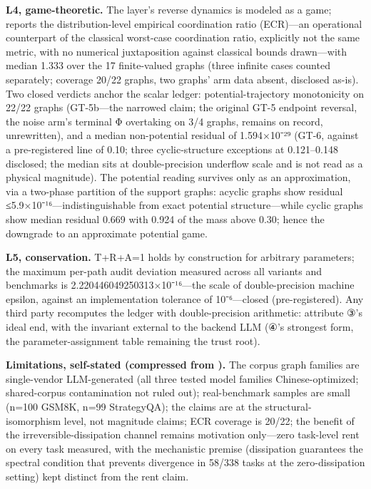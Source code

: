 \documentclass[11pt,a4paper]{article}
\begin{document}
\textbf{L4, game-theoretic.} The layer's reverse dynamics is modeled as a game; \cite{key04} reports the distribution-level empirical coordination ratio (ECR)—an operational counterpart of the classical worst-case coordination ratio, explicitly not the same metric, with no numerical juxtaposition against classical bounds drawn—with median 1.333 over the 17 finite-valued graphs (three infinite cases counted separately; coverage 20/22 graphs, two graphs' arm data absent, disclosed as-is). Two closed verdicts anchor the scalar ledger: potential-trajectory monotonicity on 22/22 graphs (GT-5b—the narrowed claim; the original GT-5 endpoint reversal, the noise arm's terminal Φ overtaking on 3/4 graphs, remains on record, unrewritten), and a median non-potential residual of 1.594×10⁻²⁹ (GT-6, against a pre-registered line of 0.10; three cyclic-structure exceptions at 0.121–0.148 disclosed; the median sits at double-precision underflow scale and is not read as a physical magnitude). The potential reading survives only as an approximation, via a two-phase partition of the support graphs: acyclic graphs show residual ≤5.9×10⁻¹⁶—indistinguishable from exact potential structure—while cyclic graphs show median residual 0.669 with 0.924 of the mass above 0.30; hence the downgrade to an approximate potential game.

\textbf{L5, conservation.} T+R+A=1 holds by construction for arbitrary parameters; the maximum per-path audit deviation measured across all variants and benchmarks is 2.220446049250313×10⁻¹⁶—the scale of double-precision machine epsilon, against an implementation tolerance of 10⁻⁶—closed (pre-registered). Any third party recomputes the ledger with double-precision arithmetic: attribute ③'s ideal end, with the invariant external to the backend LLM (④'s strongest form, the parameter-assignment table remaining the trust root).

\textbf{Limitations, self-stated (compressed from \cite{key04}).} The corpus graph families are single-vendor LLM-generated (all three tested model families Chinese-optimized; shared-corpus contamination not ruled out); real-benchmark samples are small (n=100 GSM8K, n=99 StrategyQA); the claims are at the structural-isomorphism level, not magnitude claims; ECR coverage is 20/22; the benefit of the irreversible-dissipation channel remains motivation only—zero task-level rent on every task measured, with the mechanistic premise (dissipation guarantees the spectral condition that prevents divergence in 58/338 tasks at the zero-dissipation setting) kept distinct from the rent claim.
\end{document}
